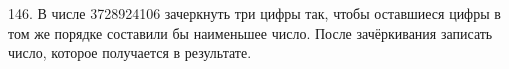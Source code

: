 146. В числе 3728924106 зачеркнуть три цифры так, чтобы оставшиеся цифры в том же порядке составили бы наименьшее число. После зачёркивания записать число, которое получается в результате.\\
